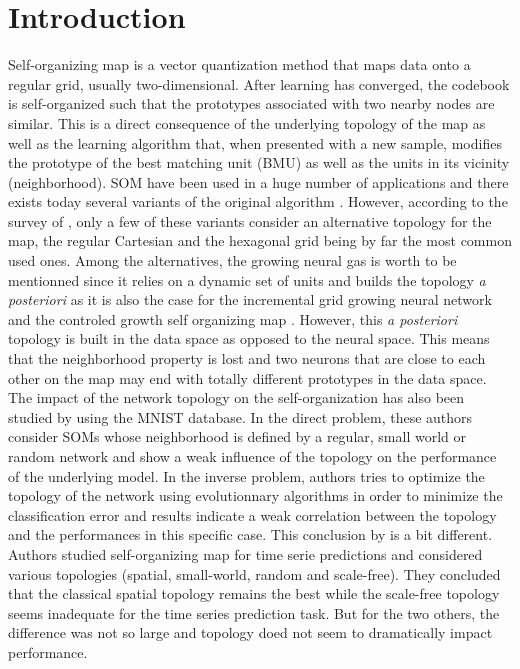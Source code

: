 \section{Introduction}

Self-organizing map \citep{Kohonen:1982} is a vector quantization method that
maps data onto a regular grid, usually two-dimensional. After learning has
converged, the codebook is self-organized such that the prototypes associated
with two nearby nodes are similar. This is a direct consequence of the
underlying topology of the map as well as the learning algorithm that, when
presented with a new sample, modifies the prototype of the best matching unit
(BMU) as well as the units in its vicinity (neighborhood). SOM have been used
in a huge number of applications \citep{Kaski:1998,Oja:2003,Polla:2009} and
there exists today several variants of the original algorithm
\citep{Kohonen:2001}. However, according to the survey of
\citet{Astudillo:2014}, only a few of these variants consider an alternative
topology for the map, the regular Cartesian and the hexagonal grid being by far
the most common used ones. Among the alternatives, the growing neural gas
\citep{Fritzke:1994} is worth to be mentionned since it relies on a dynamic set
of units and builds the topology {\em a posteriori} as it is also the case for
the incremental grid growing neural network \citep{Blackmore:1995} and the
controled growth self organizing map \citep{Alahakoon:2000}. However, this {\em
  a posteriori} topology is built in the data space as opposed to the neural
space. This means that the neighborhood property is lost and two neurons that
are close to each other on the map may end with totally different prototypes in
the data space. The impact of the network topology on the self-organization has
also been studied by \citet{Jiang:2009} using the MNIST database. In the direct
problem, these authors consider SOMs whose neighborhood is defined by a
regular, small world or random network and show a weak influence of the
topology on the performance of the underlying model. In the inverse problem,
authors tries to optimize the topology of the network using evolutionnary
algorithms \citep{Eiben:2003} in order to minimize the classification error and
results indicate a weak correlation between the topology and the performances
in this specific case. This conclusion by \citet{Burguillo:2013} is a bit
different. Authors studied self-organizing map for time serie predictions and
considered various topologies (spatial, small-world, random and
scale-free). They concluded that the classical spatial topology remains the
best while the scale-free topology seems inadequate for the time series
prediction task. But for the two others, the difference was not so large and
topology doed not seem to dramatically impact performance.\\

